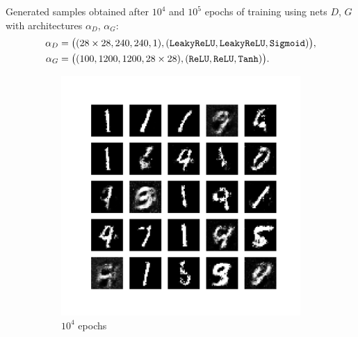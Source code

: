 \documentclass{beamer}
\begin{document}
	\begin{frame}
		Generated samples obtained after $10^{4}$ and $10^{5}$ epochs of training using nets $D$, $G$ with architectures $\alpha_D$, $\alpha_G$:
		\vspace{-0.1cm}	
		\begin{align*}
			\alpha_D &= \big((28 \times 28, 240, 240, 1), (\text{\texttt{LeakyReLU}}, \text{\texttt{LeakyReLU}}, \text{\texttt{Sigmoid}})\big), \\
			\alpha_G &= \big((100, 1200, 1200, 28 \times 28), (\text{\texttt{ReLU}}, \text{\texttt{ReLU}}, \text{\texttt{Tanh}})\big).
		\end{align*}
		\vspace{-0.5cm}
		\begin{figure}[H]
			\begin{center}
				\begin{subfigure}{0.45\textwidth}
					\includegraphics[scale = 0.24, trim = {3cm 3cm 3cm 3cm},clip]{regenerated_mnist_data_10000.pdf}
					\caption{$10^{4}$ epochs}
				\end{subfigure}
				\hspace{0.2cm}
				\begin{subfigure}{0.45\textwidth}

\end{subfigure}
\end{center}
\end{figure}
\end{frame}
\end{document}
